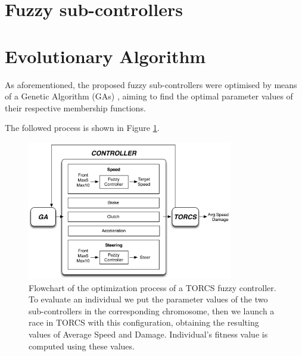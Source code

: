\documentclass[10pt,journal,compsoc]{IEEEtran}
\begin{document}

\section{Fuzzy sub-controllers}
\label{sec:subcontrollers}




\section{Evolutionary Algorithm}
\label{sec:GA_optimization}


As aforementioned, the proposed fuzzy sub-controllers were optimised by means of a Genetic Algorithm (GAs) \cite{GAs_Goldberg89}, aiming to find the optimal parameter values of their respective membership functions.

The followed process is shown in Figure \ref{fig:ga}. 

 \begin{figure}[!ht]
 	\label{fig:ga}
 	\begin{center}
 		\includegraphics[width=9cm]{fig/flowchart}
 	\end{center}
 	\caption{Flowchart of the optimization process of a TORCS
          fuzzy controller. To evaluate an individual we put the
          parameter values of the two sub-controllers in the
          corresponding chromosome, then we launch a race in TORCS
          with this configuration, obtaining the resulting values of
          Average Speed and Damage. Individual's fitness value is
          computed using these values.} %
 \end{figure}
\end{document}
